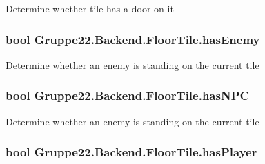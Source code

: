 Determine whether tile has a door on it 

\hypertarget{class_gruppe22_1_1_backend_1_1_floor_tile_afe86d0c8424017818f04e2b0688e5c75}{
\subsubsection[{has\-Enemy}]{\setlength{\rightskip}{0pt plus 5cm}bool Gruppe22.\-Backend.\-Floor\-Tile.\-has\-Enemy\hspace{0.3cm}{\ttfamily [get]}}}\label{class_gruppe22_1_1_backend_1_1_floor_tile_afe86d0c8424017818f04e2b0688e5c75}


Determine whether an enemy is standing on the current tile 

\hypertarget{class_gruppe22_1_1_backend_1_1_floor_tile_a48a520d5f87a7f53f967d332458137b2}{
\subsubsection[{has\-N\-P\-C}]{\setlength{\rightskip}{0pt plus 5cm}bool Gruppe22.\-Backend.\-Floor\-Tile.\-has\-N\-P\-C\hspace{0.3cm}{\ttfamily [get]}}}\label{class_gruppe22_1_1_backend_1_1_floor_tile_a48a520d5f87a7f53f967d332458137b2}


Determine whether an enemy is standing on the current tile 

\hypertarget{class_gruppe22_1_1_backend_1_1_floor_tile_a13d1616f29393cef6bebe40c140902e2}{
\subsubsection[{has\-Player}]{\setlength{\rightskip}{0pt plus 5cm}bool Gruppe22.\-Backend.\-Floor\-Tile.\-has\-Player\hspace{0.3cm}{\ttfamily [get]}}}\label{class_gruppe22_1_1_backend_1_1_floor_tile_a13d1616f29393cef6bebe40c140902e2}


